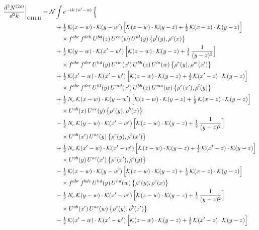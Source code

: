 \documentclass[10pt]{article}
\numberwithin{equation}{section}
\newcommand{\KK}{\mathcal K}
\newcommand{\NN}{\mathcal N}
\begin{document}
\begin{align}
\frac{d^3N^{(2\rho)}}{d^3k}\bigg|_{\rm GIII.II}={}&\NN\int e^{-ik\cdot(w'-w)}\,\Big\{\notag\\
&\quad +\tfrac12\,\KK(x-w)\cdot\KK(y-w')\,\Big[\KK(z-w)\cdot\KK(y-z)+\tfrac12\,\KK(x-z)\cdot\KK(y-z)\Big]\notag\\
&\qquad\times f^{abc}\,f^{deh}\,U^{bd}(z)\,U^{ea}(w)\,U^{hl}(y)\,\big\{\rho^{l}(y),\rho^{c}(x)\big\}\notag\\
&\quad +\tfrac12\,\KK(y-w)\cdot\KK(x'-w')\,\Big[\KK(z-w)\cdot\KK(y-z)+\tfrac12\,\frac{1}{(y-z)^2}\Big]\notag\\
&\qquad\times f^{abc}\,f^{dce}\,U^{hd}(y)\,U^{lm}(x')\,U^{bh}(z)\,U^{la}(w)\,\big\{\rho^{e}(y),\rho^{m}(x')\big\}\notag\\
&\quad +\tfrac12\,\KK(x'-w)\cdot\KK(x'-w')\,\Big[\KK(z-w)\cdot\KK(y-z)+\tfrac12\,\KK(x'-z)\cdot\KK(y-z)\Big]\notag\\
&\qquad\times f^{abc}\,f^{dce}\,U^{hl}(y)\,U^{md}(x')\,U^{bh}(z)\,U^{ma}(w)\,\big\{\rho^{e}(x'),\rho^{l}(y)\big\}\notag\\
&\quad +\tfrac12\,N_{c}\,\KK(x-w)\cdot\KK(y-w')\,\Big[\KK(z-w)\cdot\KK(y-z)+\tfrac12\,\KK(x-z)\cdot\KK(y-z)\Big]\notag\\
&\qquad\times U^{ab}(x)\,U^{ac}(y)\,\big\{\rho^{c}(y),\rho^{b}(x)\big\}\notag\\
&\quad -\tfrac12\,N_{c}\,\KK(y-w)\cdot\KK(x'-w')\,\Big[\KK(z-w)\cdot\KK(y-z)+\tfrac12\,\frac{1}{(y-z)^2}\Big]\notag\\
&\qquad\times U^{ab}(x')\,U^{ac}(y)\,\big\{\rho^{c}(y),\rho^{b}(x')\big\}\notag\\
&\quad +\tfrac12\,N_{c}\,\KK(x'-w)\cdot\KK(x'-w')\,\Big[\KK(z-w)\cdot\KK(y-z)+\tfrac12\,\KK(x'-z)\cdot\KK(y-z)\Big]\notag\\
&\qquad\times U^{ab}(y)\,U^{ac}(x')\,\big\{\rho^{c}(x'),\rho^{b}(y)\big\}\notag\\
&\quad -\tfrac12\,\KK(x-w)\cdot\KK(y-w')\,\Big[\KK(z-w)\cdot\KK(y-z)+\tfrac12\,\KK(x-z)\cdot\KK(y-z)\Big]\notag\\
&\qquad\times f^{abc}\,f^{bde}\,U^{hd}(y)\,U^{ha}(w)\,\big\{\rho^{e}(y),\rho^{c}(x)\big\}\notag\\
&\quad -\tfrac12\,N_{c}\,\KK(y-w)\cdot\KK(x'-w')\,\Big[\KK(z-w)\cdot\KK(y-z)+\tfrac12\,\frac{1}{(y-z)^2}\Big]\notag\\
&\qquad\times U^{ab}(x')\,U^{ac}(w)\,\big\{\rho^{c}(y),\rho^{b}(x')\big\}\notag\\
&\quad -\tfrac12\,\KK(x'-w)\cdot\KK(x'-w')\,\Big[\KK(z-w)\cdot\KK(y-z)+\tfrac12\,\KK(x'-z)\cdot\KK(y-z)\Big]\notag\\

\end{align}
\end{document}

